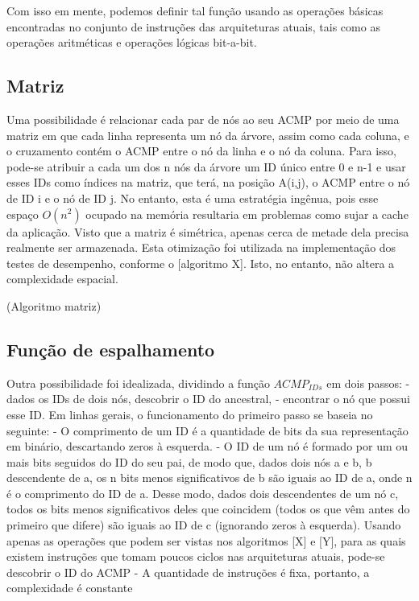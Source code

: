 Com isso em mente, podemos definir tal função usando as operações básicas encontradas no conjunto de instruções das arquiteturas atuais,
tais como as operações aritméticas e operações lógicas bit-a-bit.

\subsection{Matriz}

Uma possibilidade é relacionar cada par de nós ao seu ACMP por meio de uma matriz
em que cada linha representa um nó da árvore, assim como cada coluna, e o cruzamento contém o ACMP entre o nó da linha e o nó da coluna.
Para isso, pode-se atribuir a cada um dos n nós da árvore um ID único entre 0 e n-1 e usar esses IDs como índices na matriz,
que terá, na posição A(i,j), o ACMP entre o nó de ID i e o nó de ID j.
No entanto, esta é uma estratégia ingênua, pois esse espaço $O(n^2)$ ocupado na memória resultaria em problemas como sujar a cache da aplicação.
Visto que a matriz é simétrica, apenas cerca de metade dela precisa realmente ser armazenada.
Esta otimização foi utilizada na implementação dos testes de desempenho, conforme o [algoritmo X].
Isto, no entanto, não altera a complexidade espacial.

(Algoritmo matriz)

\subsection{Função de espalhamento}

Outra possibilidade foi idealizada, dividindo a função $ACMP_{IDs}$ em dois passos:
- dados os IDs de dois nós, descobrir o ID do ancestral,
- encontrar o nó que possui esse ID.
Em linhas gerais, o funcionamento do primeiro passo se baseia no seguinte:
- O comprimento de um ID é a quantidade de bits da sua representação em binário, descartando zeros à esquerda.
- O ID de um nó é formado por um ou mais bits seguidos do ID do seu pai, de modo que, dados dois nós a e b, b descendente de a,
os n bits menos significativos de b são iguais ao ID de a, onde n é o comprimento do ID de a.
Desse modo, dados dois descendentes de um nó c, todos os bits menos significativos deles que coincidem
(todos os que vêm antes do primeiro que difere) são iguais ao ID de c (ignorando zeros à esquerda).
Usando apenas as operações que podem ser vistas nos algoritmos [X] e [Y],
para as quais existem instruções que tomam poucos ciclos nas arquiteturas atuais, pode-se descobrir o ID do ACMP
- A quantidade de instruções é fixa, portanto, a complexidade é constante

